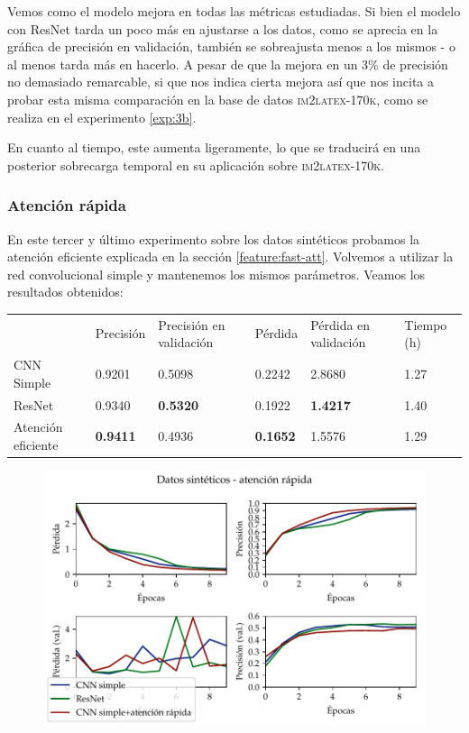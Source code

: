 \documentclass[a4paper, 20pt, dvipsnames]{article}
\begin{document}
Vemos como el modelo mejora en todas las métricas estudiadas. Si bien el modelo
con ResNet tarda un poco más en ajustarse a los datos, como se aprecia en la
gráfica de precisión en validación, también se sobreajusta menos a los mismos -
o al menos tarda más en hacerlo. A pesar de que la mejora en un 3\% de precisión
no demasiado remarcable, si que nos indica cierta mejora así que nos incita a
probar esta misma comparación en la base de datos \textsc{im2latex-170k}, como se realiza en
el experimento \ref{exp:3b}.

En cuanto al tiempo, este aumenta ligeramente, lo que se traducirá en una
posterior sobrecarga temporal en su aplicación sobre \textsc{im2latex-170k}.


\subsubsection{Atención rápida}
\label{exp:toy3}

En este tercer y último experimento sobre los datos sintéticos probamos la
atención eficiente explicada en la sección \ref{feature:fast-att}. Volvemos a
utilizar la red convolucional simple y mantenemos los mismos parámetros. Veamos
los resultados obtenidos:

\begin{table}[h]
	\centering
	\begin{tabular}{llllll}
		& Precisión       & Precisión en validación & Pérdida         & Pérdida en validación & Tiempo (h) \\ \cline{2-6} 
		CNN Simple         & 0.9201          & 0.5098                  & 0.2242          & 2.8680                & 1.27       \\
		ResNet             & 0.9340          & \textbf{0.5320}         & 0.1922          & \textbf{1.4217}       & 1.40       \\
		Atención eficiente & \textbf{0.9411} & 0.4936                  & \textbf{0.1652} & 1.5576                & 1.29      
	\end{tabular}
\end{table}

\begin{figure}[H]
	\centering
	\includegraphics{fig/toy-3.pdf}
\end{figure}
\end{document}
